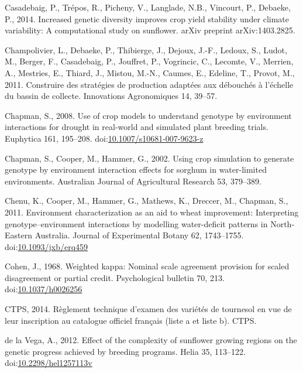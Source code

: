 \documentclass[a4paper]{article}
\begin{document}
\hypertarget{ref-Casadebaig2014}{}
Casadebaig, P., Trépos, R., Picheny, V., Langlade, N.B., Vincourt, P.,
Debaeke, P., 2014. Increased genetic diversity improves crop yield
stability under climate variability: A computational study on sunflower.
arXiv preprint arXiv:1403.2825.

\hypertarget{ref-Champolivier2011}{}
Champolivier, L., Debaeke, P., Thibierge, J., Dejoux, J.-F., Ledoux, S.,
Ludot, M., Berger, F., Casadebaig, P., Jouffret, P., Vogrincic, C.,
Lecomte, V., Merrien, A., Mestries, E., Thiard, J., Mistou, M.-N.,
Caumes, E., Edeline, T., Provot, M., 2011. Construire des stratégies de
production adaptées aux débouchés à l'échelle du bassin de collecte.
Innovations Agronomiques 14, 39--57.

\hypertarget{ref-Chapman2008}{}
Chapman, S., 2008. Use of crop models to understand genotype by
environment interactions for drought in real-world and simulated plant
breeding trials. Euphytica 161, 195--208.
doi:\href{https://doi.org/10.1007/s10681-007-9623-z}{10.1007/s10681-007-9623-z}

\hypertarget{ref-Chapman2002}{}
Chapman, S., Cooper, M., Hammer, G., 2002. Using crop simulation to
generate genotype by environment interaction effects for sorghum in
water-limited environments. Australian Journal of Agricultural Research
53, 379--389.

\hypertarget{ref-Chenu2011}{}
Chenu, K., Cooper, M., Hammer, G., Mathews, K., Dreccer, M., Chapman,
S., 2011. Environment characterization as an aid to wheat improvement:
Interpreting genotype--environment interactions by modelling
water-deficit patterns in North-Eastern Australia. Journal of
Experimental Botany 62, 1743--1755.
doi:\href{https://doi.org/10.1093/jxb/erq459}{10.1093/jxb/erq459}

\hypertarget{ref-Cohen1968}{}
Cohen, J., 1968. Weighted kappa: Nominal scale agreement provision for
scaled disagreement or partial credit. Psychological bulletin 70, 213.
doi:\href{https://doi.org/10.1037/h0026256}{10.1037/h0026256}

\hypertarget{ref-CTPS2014}{}
CTPS, 2014. Règlement technique d'examen des variétés de tournesol en
vue de leur inscription au catalogue officiel français (liste a et liste
b). CTPS.

\hypertarget{ref-Vega2012}{}
de la Vega, A., 2012. Effect of the complexity of sunflower growing
regions on the genetic progress achieved by breeding programs. Helia 35,
113--122.
doi:\href{https://doi.org/10.2298/hel1257113v}{10.2298/hel1257113v}
\end{document}
